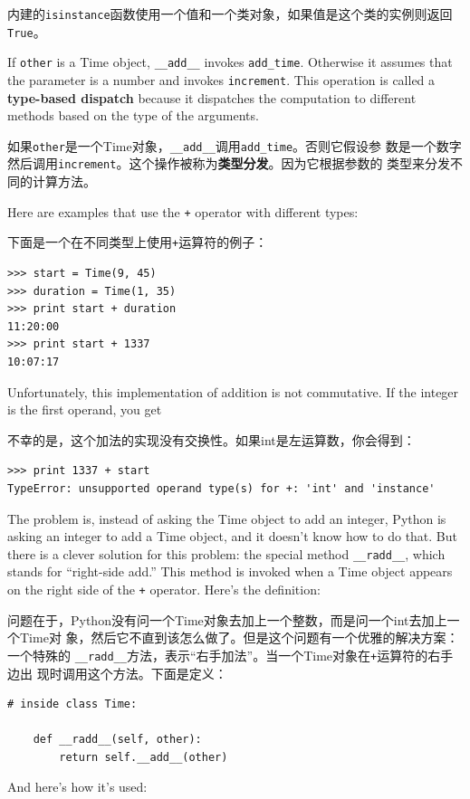 \documentclass[10pt]{book}
\begin{document}
\begin{CJK}{UTF8}{gbsn}
内建的{\tt isinstance}函数使用一个值和一个类对象，如果值是这个类的实例则返回
{\tt True}。

If {\tt other} is a Time object, \verb"__add__" invokes
\verb"add_time".  Otherwise it assumes that the parameter
is a number and invokes {\tt increment}.  This operation is
called a {\bf type-based dispatch} because it dispatches the
computation to different methods based on the type of the
arguments.

如果{\tt other}是一个Time对象，\verb"__add__"调用\verb"add_time"。否则它假设参
数是一个数字然后调用{\tt increment}。这个操作被称为{\bf 类型分发}。因为它根据参数的
类型来分发不同的计算方法。

Here are examples that use the {\tt +} operator with different
types:

下面是一个在不同类型上使用{\tt +}运算符的例子：

\begin{verbatim}
>>> start = Time(9, 45)
>>> duration = Time(1, 35)
>>> print start + duration
11:20:00
>>> print start + 1337
10:07:17
\end{verbatim}
%
Unfortunately, this implementation of addition is not commutative.
If the integer is the first operand, you get

不幸的是，这个加法的实现没有交换性。如果int是左运算数，你会得到：

\begin{verbatim}
>>> print 1337 + start
TypeError: unsupported operand type(s) for +: 'int' and 'instance'
\end{verbatim}
%
The problem is, instead of asking the Time object to add an integer,
Python is asking an integer to add a Time object, and it doesn't know
how to do that.  But there is a clever solution for this problem: the
special method \verb"__radd__", which stands for ``right-side add.''
This method is invoked when a Time object appears on the right side of
the {\tt +} operator.  Here's the definition:

问题在于，Python没有问一个Time对象去加上一个整数，而是问一个int去加上一个Time对
象，然后它不直到该怎么做了。但是这个问题有一个优雅的解决方案：一个特殊的
\verb"__radd__"方法，表示``右手加法''。当一个Time对象在{\tt +}运算符的右手边出
现时调用这个方法。下面是定义：

\begin{verbatim}
# inside class Time:

    def __radd__(self, other):
        return self.__add__(other)
\end{verbatim}
%
And here's how it's used:


\end{CJK}
\end{document}
